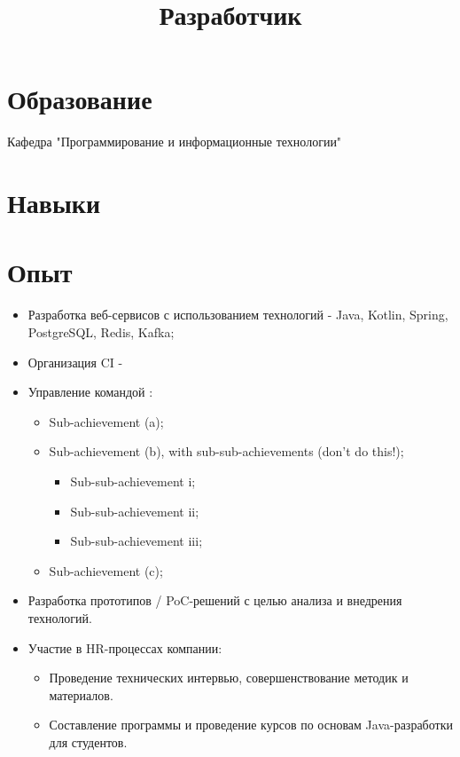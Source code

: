 \documentclass[11pt,a4paper,sans]{moderncv}        %
\title{Разработчик}                               %
\begin{document}
\makecvtitle

\section{Образование}
{Кафедра "Программирование и информационные технологии"}


\renewcommand{\listitemsymbol}{-~}

\section{Навыки}


\section{Опыт}
{
\begin{itemize}
\item Разработка веб-сервисов с использованием технологий - Java, Kotlin, Spring, PostgreSQL, Redis, Kafka;
\item Организация CI - 
\item Управление командой :
  \begin{itemize}
  \item Sub-achievement (a);
  \item Sub-achievement (b), with sub-sub-achievements (don't do this!);
    \begin{itemize}
    \item Sub-sub-achievement i;
    \item Sub-sub-achievement ii;
    \item Sub-sub-achievement iii;
    \end{itemize}
  \item Sub-achievement (c);
  \end{itemize}
\item Разработка прототипов / PoC-решений с целью анализа и внедрения технологий.
\item Участие в HR-процессах компании:
  \begin{itemize}
    \item Проведение технических интервью, совершенствование методик и материалов.
    \item Составление программы и проведение курсов по основам Java-разработки для студентов.
  \end{itemize}
\end{itemize}}
\end{document}
